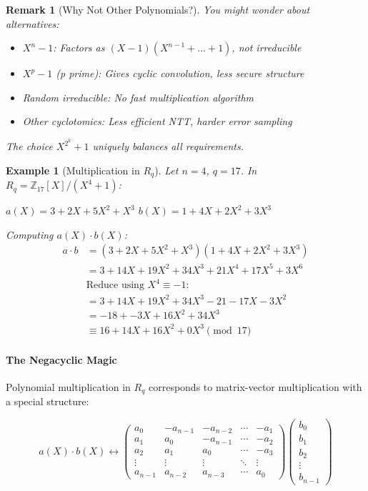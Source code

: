 \documentclass[11pt,a4paper]{article}
\newtheorem{example}{Example}
\newtheorem{remark}{Remark}
\begin{document}
\begin{remark}[Why Not Other Polynomials?]
You might wonder about alternatives:
\begin{itemize}
    \item $X^n - 1$: Factors as $(X-1)(X^{n-1} + ... + 1)$, not irreducible
    \item $X^p - 1$ (p prime): Gives cyclic convolution, less secure structure
    \item Random irreducible: No fast multiplication algorithm
    \item Other cyclotomics: Less efficient NTT, harder error sampling
\end{itemize}
The choice $X^{2^k} + 1$ uniquely balances all requirements.
\end{remark}

\begin{example}[Multiplication in $R_q$]
Let $n = 4$, $q = 17$. In $R_q = \mathbb{Z}_{17}[X]/(X^4 + 1)$:

$a(X) = 3 + 2X + 5X^2 + X^3$
$b(X) = 1 + 4X + 2X^2 + 3X^3$

Computing $a(X) \cdot b(X)$:
\begin{align}
a \cdot b &= (3 + 2X + 5X^2 + X^3)(1 + 4X + 2X^2 + 3X^3)\\
&= 3 + 14X + 19X^2 + 34X^3 + 21X^4 + 17X^5 + 3X^6\\
&\text{Reduce using } X^4 \equiv -1:\\
&= 3 + 14X + 19X^2 + 34X^3 - 21 - 17X - 3X^2\\
&= -18 + -3X + 16X^2 + 34X^3\\
&\equiv 16 + 14X + 16X^2 + 0X^3 \pmod{17}
\end{align}
\end{example}

\paragraph{The Negacyclic Magic}

Polynomial multiplication in $R_q$ corresponds to matrix-vector multiplication with a special structure:

\begin{equation}
a(X) \cdot b(X) \leftrightarrow 
\begin{pmatrix}
a_0 & -a_{n-1} & -a_{n-2} & \cdots & -a_1 \\
a_1 & a_0 & -a_{n-1} & \cdots & -a_2 \\
a_2 & a_1 & a_0 & \cdots & -a_3 \\
\vdots & \vdots & \vdots & \ddots & \vdots \\
a_{n-1} & a_{n-2} & a_{n-3} & \cdots & a_0
\end{pmatrix}
\begin{pmatrix}
b_0 \\ b_1 \\ b_2 \\ \vdots \\ b_{n-1}
\end{pmatrix}
\end{equation}
\end{document}
